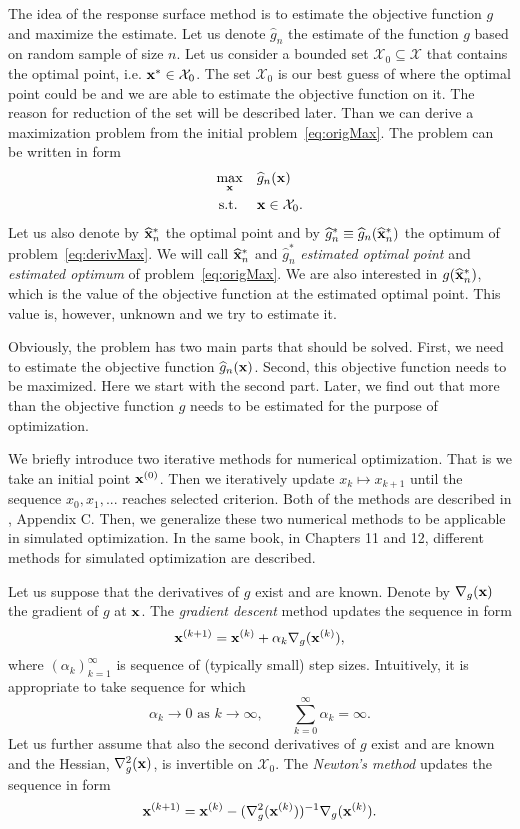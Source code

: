 The idea of the response surface method is to estimate the objective function $g$ and maximize the estimate. Let us denote $\widehat{g}_n$ the estimate of the function $g$ based on random sample of size $n$. Let us consider a bounded set $\mathcal{X}_0 \subseteq \mathcal{X}$ that contains the optimal point, i.e. $\mathbf{x}^{*} \in \mathcal{X}_0$. The set $\mathcal{X}_0$ is our best guess of where the optimal point could be and we are able to estimate the objective function on it. The reason for reduction of the set will be described later. Than we can derive a maximization problem from the initial problem~\eqref{eq:origMax}. The problem can be written in form
\begin{equation}
	\label{eq:derivMax}
	\begin{aligned}
		& \underset{\mathbf{x}}{\max} & & \widehat{g}_n (\mathbf{x}) \\
		& \operatorname{\textrm{s.t.}} & & \mathbf{x} \in \mathcal{X}_0.
	\end{aligned}
\end{equation}
Let us also denote by $\widehat{\mathbf{x}}^{*}_n$ the optimal point and by $ \widehat{g}^{*}_n \equiv \widehat{g}_n (\widehat{\mathbf{x}}^{*}_n)$ the optimum of problem~\eqref{eq:derivMax}. We will call $\widehat{\mathbf{x}}^{*}_n$ and $\widehat{g}^{*}_n$ \emph{estimated optimal point} and \emph{estimated optimum} of problem~\eqref{eq:origMax}. We are also interested in $g (\widehat{\mathbf{x}}^{*}_n)$, which is the value of the objective function at the estimated optimal point. This value is, however, unknown and we try to estimate it.

Obviously, the problem has two main parts that should be solved. First, we need to estimate the objective function $\widehat{g}_n (\mathbf{x})$. Second, this objective function needs to be maximized. Here we start with the second part. Later, we find out that more than the objective function $g$ needs to be estimated for the purpose of optimization.

We briefly introduce two iterative methods for numerical optimization. That is we take an initial point $\mathbf{x}^{(0)}$. Then we iteratively update $x_k \mapsto x_{k+1}$ until the sequence $x_0, x_1, ...$ reaches selected criterion. Both of the methods are described in \cite{kroese11}, Appendix C. Then, we generalize these two numerical methods to be applicable in simulated optimization. In the same book, in Chapters 11 and 12, different methods for simulated optimization are described. 

Let us suppose that the derivatives of $g$ exist and are known. Denote by $\nabla_{g} (\mathbf{x})$ the gradient of $g$ at $\mathbf{x}$. The \emph{gradient descent} method updates the sequence in form
\[
	\mathbf{x}^{(k+1)} = \mathbf{x}^{(k)} + \alpha_k \nabla_{g} (\mathbf{x}^{(k)}),
\]
where $(\alpha_k)_{k=1}^{\infty}$ is sequence of (typically small) step sizes. Intuitively, it is appropriate to take sequence for which
\[
	\alpha_k \to 0 \text{ as } k \to \infty, \qquad \sum_{k=0}^{\infty} \alpha_k = \infty.
\]
Let us further assume that also the second derivatives of $g$ exist and are known and the Hessian, $\nabla^2_{g} (\mathbf{x})$, is invertible on $\mathcal{X}_0$. The \emph{Newton's method} updates the sequence in form
\[
	\mathbf{x}^{(k+1)} = \mathbf{x}^{(k)} - (\nabla^2_{g} (\mathbf{x}^{(k)}))^{-1} \nabla_{g} (\mathbf{x}^{(k)}).
\]

